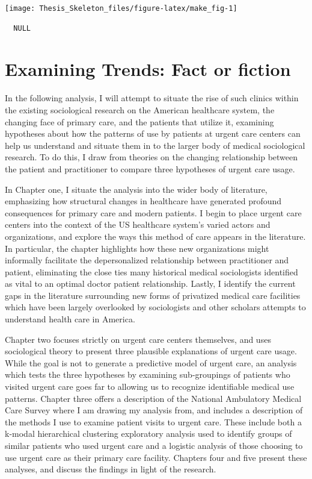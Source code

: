 \documentclass[12pt,twoside]{reedthesis}
\begin{document}
  \begin{center}\texttt{[image: Thesis\_Skeleton\_files/figure-latex/make\_fig-1]} \end{center}
  
  \begin{verbatim}
  NULL
  \end{verbatim}
  
  \section{Examining Trends: Fact or
  fiction}\label{examining-trends-fact-or-fiction}
  
  In the following analysis, I will attempt to situate the rise of such
  clinics within the existing sociological research on the American
  healthcare system, the changing face of primary care, and the patients
  that utilize it, examining hypotheses about how the patterns of use by
  patients at urgent care centers can help us understand and situate them
  in to the larger body of medical sociological research. To do this, I
  draw from theories on the changing relationship between the patient and
  practitioner to compare three hypotheses of urgent care usage.
  
  In Chapter one, I situate the analysis into the wider body of
  literature, emphasizing how structural changes in healthcare have
  generated profound consequences for primary care and modern patients. I
  begin to place urgent care centers into the context of the US healthcare
  system's varied actors and organizations, and explore the ways this
  method of care appears in the literature. In particular, the chapter
  highlights how these new organizations might informally facilitate the
  depersonalized relationship between practitioner and patient,
  eliminating the close ties many historical medical sociologists
  identified as vital to an optimal doctor patient relationship. Lastly, I
  identify the current gaps in the literature surrounding new forms of
  privatized medical care facilities which have been largely overlooked by
  sociologists and other scholars attempts to understand health care in
  America.
  
  Chapter two focuses strictly on urgent care centers themselves, and uses
  sociological theory to present three plausible explanations of urgent
  care usage. While the goal is not to generate a predictive model of
  urgent care, an analysis which tests the three hypotheses by examining
  sub-groupings of patients who visited urgent care goes far to allowing
  us to recognize identifiable medical use patterns. Chapter three offers
  a description of the National Ambulatory Medical Care Survey where I am
  drawing my analysis from, and includes a description of the methods I
  use to examine patient visits to urgent care. These include both a
  k-modal hierarchical clustering exploratory analysis used to identify
  groups of similar patients who used urgent care and a logistic analysis
  of those choosing to use urgent care as their primary care facility.
  Chapters four and five present these analyses, and discuss the findings
  in light of the research.
  
\end{document}
